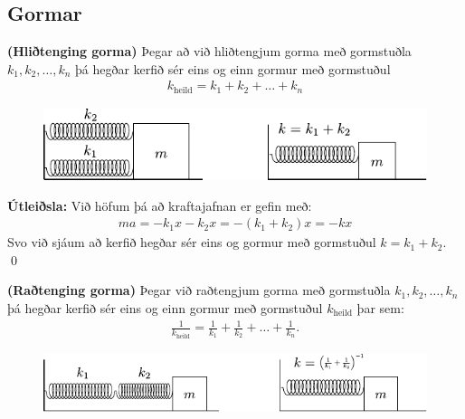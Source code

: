 \ifdefined \wholebook \else\documentclass[oneside]{book}\usepackage{EdlBook}\graphicspath{{figures/}}
\begin{document}
\subsection*{Gormar}

\begin{tcolorbox}
\begin{theorem}
\textbf{(Hliðtenging gorma)} Þegar að við hliðtengjum gorma með gormstuðla $k_1,k_2, \ldots, k_n$ þá hegðar kerfið sér eins og einn gormur með gormstuðul
\begin{align*}
    k_{\text{heild}} = k_1 + k_2 + \ldots + k_n
\end{align*}
\end{theorem}
\begin{figure}[H]
    \centering
    \includegraphics{figures/hlidtenging-gormar.pdf}
\end{figure}
\end{tcolorbox}

\textbf{Útleiðsla:} Við höfum þá að kraftajafnan er gefin með:
\begin{align*}
    ma = -k_1x - k_2 x = -(k_1+k_2)x = -kx
\end{align*}
Svo við sjáum að kerfið hegðar sér eins og gormur með gormstuðul $k = k_1 + k_2$. \qed

\begin{tcolorbox}
\begin{theorem}
\textbf{(Raðtenging gorma)} Þegar við raðtengjum gorma með gormstuðla $k_1, k_2, \ldots, k_n$ þá hegðar kerfið sér eins og einn gormur með gormstuðul $k_{\text{heild}}$ þar sem:
\begin{align*}
    \frac{1}{k_{\text{heild}}} = \frac{1}{k_1} + \frac{1}{k_2} + \ldots + \frac{1}{k_n}.
\end{align*}
\end{theorem}
\begin{figure}[H]
    \centering
    \includegraphics{figures/radtengdir-gormar.pdf}
\end{figure}
\end{tcolorbox}
\end{document}
